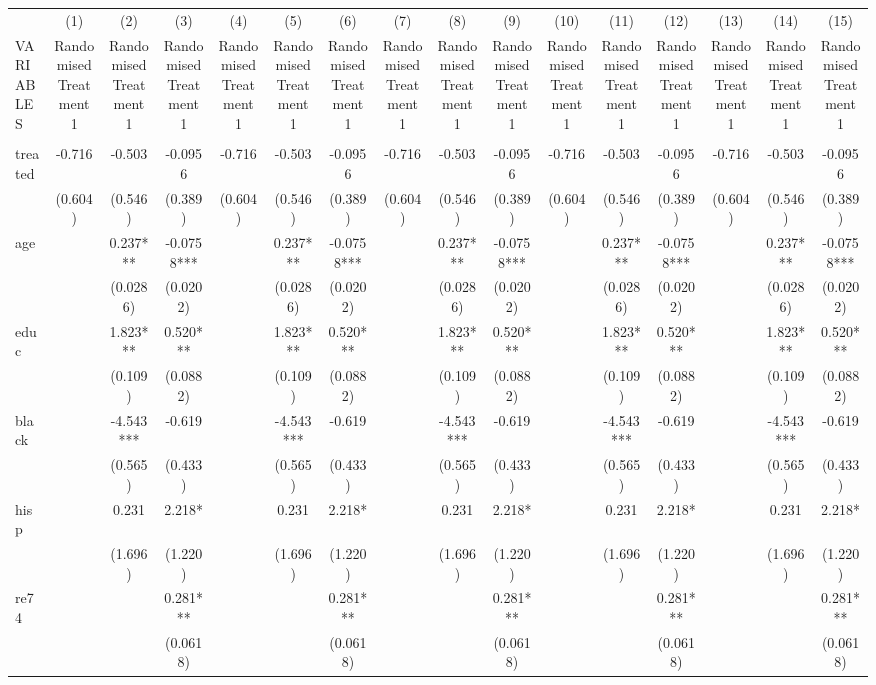 \documentclass[]{article}
\begin{document}
\begin{tabular}{lccccccccccccccc} \hline
 & (1) & (2) & (3) & (4) & (5) & (6) & (7) & (8) & (9) & (10) & (11) & (12) & (13) & (14) & (15) \\
VARIABLES & Randomised Treatment 1 & Randomised Treatment 1 & Randomised Treatment 1 & Randomised Treatment 1 & Randomised Treatment 1 & Randomised Treatment 1 & Randomised Treatment 1 & Randomised Treatment 1 & Randomised Treatment 1 & Randomised Treatment 1 & Randomised Treatment 1 & Randomised Treatment 1 & Randomised Treatment 1 & Randomised Treatment 1 & Randomised Treatment 1 \\ \hline
 &  &  &  &  &  &  &  &  &  &  &  &  &  &  &  \\
treated & -0.716 & -0.503 & -0.0956 & -0.716 & -0.503 & -0.0956 & -0.716 & -0.503 & -0.0956 & -0.716 & -0.503 & -0.0956 & -0.716 & -0.503 & -0.0956 \\
 & (0.604) & (0.546) & (0.389) & (0.604) & (0.546) & (0.389) & (0.604) & (0.546) & (0.389) & (0.604) & (0.546) & (0.389) & (0.604) & (0.546) & (0.389) \\
age &  & 0.237*** & -0.0758*** &  & 0.237*** & -0.0758*** &  & 0.237*** & -0.0758*** &  & 0.237*** & -0.0758*** &  & 0.237*** & -0.0758*** \\
 &  & (0.0286) & (0.0202) &  & (0.0286) & (0.0202) &  & (0.0286) & (0.0202) &  & (0.0286) & (0.0202) &  & (0.0286) & (0.0202) \\
educ &  & 1.823*** & 0.520*** &  & 1.823*** & 0.520*** &  & 1.823*** & 0.520*** &  & 1.823*** & 0.520*** &  & 1.823*** & 0.520*** \\
 &  & (0.109) & (0.0882) &  & (0.109) & (0.0882) &  & (0.109) & (0.0882) &  & (0.109) & (0.0882) &  & (0.109) & (0.0882) \\
black &  & -4.543*** & -0.619 &  & -4.543*** & -0.619 &  & -4.543*** & -0.619 &  & -4.543*** & -0.619 &  & -4.543*** & -0.619 \\
 &  & (0.565) & (0.433) &  & (0.565) & (0.433) &  & (0.565) & (0.433) &  & (0.565) & (0.433) &  & (0.565) & (0.433) \\
hisp &  & 0.231 & 2.218* &  & 0.231 & 2.218* &  & 0.231 & 2.218* &  & 0.231 & 2.218* &  & 0.231 & 2.218* \\
 &  & (1.696) & (1.220) &  & (1.696) & (1.220) &  & (1.696) & (1.220) &  & (1.696) & (1.220) &  & (1.696) & (1.220) \\
re74 &  &  & 0.281*** &  &  & 0.281*** &  &  & 0.281*** &  &  & 0.281*** &  &  & 0.281*** \\
 &  &  & (0.0618) &  &  & (0.0618) &  &  & (0.0618) &  &  & (0.0618) &  &  & (0.0618) \\

\end{tabular}
\end{document}
